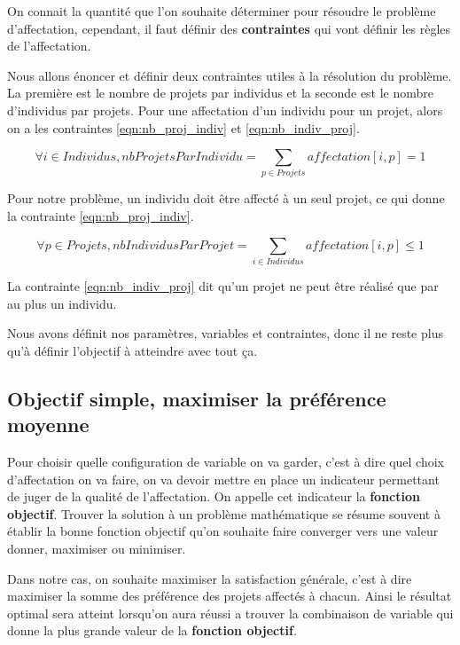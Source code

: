 \documentclass[final,poster]{polytech/polytech}
\begin{document}
On connait la quantité que l'on souhaite déterminer pour résoudre le problème d'affectation, cependant, il faut définir des \textbf{contraintes} qui vont définir les règles de l'affectation.

Nous allons énoncer et définir deux contraintes utiles à la résolution du problème. La première est le nombre de projets par individus et la seconde est le nombre d'individus par projets.
Pour une affectation d'un individu pour un projet, alors on a les contraintes \eqref{eqn:nb_proj_indiv} et \eqref{eqn:nb_indiv_proj}.

\begin{equation}
\label{eqn:nb_proj_indiv}
\forall i \in Individus, nbProjetsParIndividu= \sum_{p \in Projets} affectation[i,p] = 1
\end{equation}

Pour notre problème, un individu doit être affecté à un seul projet, ce qui donne la contrainte \eqref{eqn:nb_proj_indiv}.

\begin{equation}
\label{eqn:nb_indiv_proj}
\forall p \in Projets, nbIndividusParProjet= \sum_{i \in Individus} affectation[i,p] \leqslant 1
\end{equation}

La contrainte \eqref{eqn:nb_indiv_proj} dit qu'un projet ne peut être réalisé que par au plus un individu.

Nous avons définit nos paramètres, variables et contraintes, donc il ne reste plus qu'à définir l'objectif à atteindre avec tout ça.
\subsection{Objectif simple, maximiser la préférence moyenne}
\label{sec:max_pref_moy}

Pour choisir quelle configuration de variable on va garder, c'est à dire quel choix d'affectation on va faire, on va devoir mettre en place un indicateur permettant de juger de la qualité de l'affectation.
On appelle cet indicateur la \textbf{fonction objectif}.
Trouver la solution à un problème mathématique se résume souvent à établir la bonne fonction objectif qu'on souhaite faire converger vers une valeur donner, maximiser ou minimiser.


Dans notre cas, on souhaite maximiser la satisfaction générale, c'est à dire maximiser la somme des préférence des projets affectés à chacun. Ainsi le résultat optimal sera atteint lorsqu'on aura réussi a trouver la combinaison de variable qui donne la plus grande valeur de la \textbf{fonction objectif}.
\end{document}
